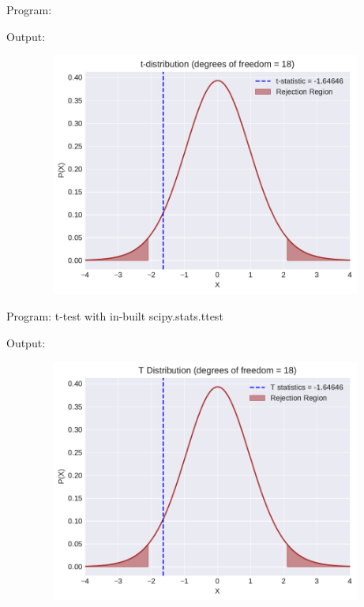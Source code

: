 \documentclass[a4paper,11pt,openright]{report}
\begin{document}
\begin{enumerate}
Program:


\vspace{0.5cm}

Output:


\begin{figure}[ht!]
\includegraphics[width=16cm,height=8cm,keepaspectratio]{tscript3.pdf}
\centering
\end{figure}

\pagebreak

Program: t-test with in-built scipy.stats.ttest


\vspace{1cm}

Output:


\begin{figure}[ht!]
\includegraphics[width=16cm,height=8cm,keepaspectratio]{ttest2.pdf}
\centering
\end{figure}

\end{enumerate}
\end{document}
